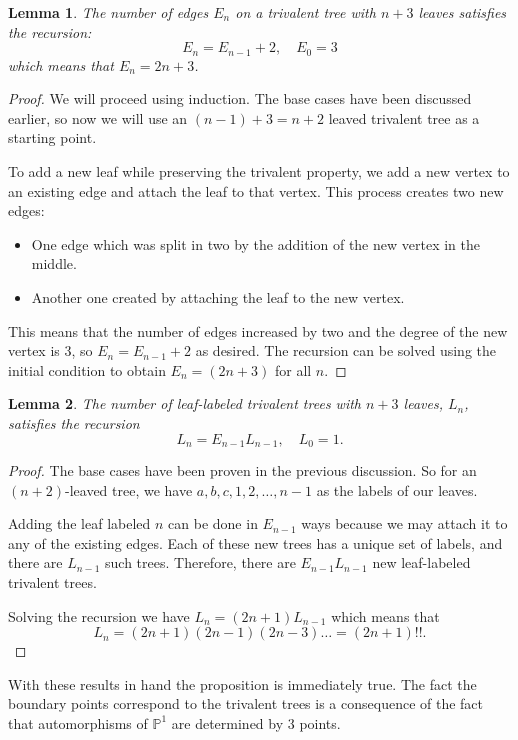 \documentclass[11pt]{article}
\newcommand{\bP}{\mathbb{P}}
\newtheorem{Lem}{Lemma}                 %
\theoremstyle{definition}
\theoremstyle{remark}
\numberwithin{theorem}{section}
\begin{document}
\begin{Lem}
The number of edges $E_n$ on a trivalent tree with $n+3$ leaves satisfies the recursion:
$$E_n=E_{n-1}+2,\quad E_0=3$$
which means that $E_n=2n+3$.
\end{Lem}

\begin{proof}
    We will proceed using induction. The base cases have been discussed earlier, so now we will use an $(n-1)+3=n+2$ leaved trivalent tree as a starting point.\par 
To add a new leaf while preserving the trivalent property, we add a new vertex to an existing edge and attach the leaf to that vertex. This process creates two new edges: 
\begin{itemize}
    \item One edge which was split in two by the addition of the new vertex in the middle.
    \item Another one created by attaching the leaf to the new vertex.
\end{itemize}
  This means that the number of edges increased by two and the degree of the new vertex is $3$, so $E_n=E_{n-1}+2$ as desired. The recursion can be solved using the initial condition to obtain $E_n=(2n+3)$ for all $n$.
\end{proof}

\begin{Lem}
The number of leaf-labeled trivalent trees with $n+3$ leaves, $L_n$, satisfies the recursion 
$$L_{n}=E_{n-1}L_{n-1},\quad L_0=1.$$ 
\end{Lem}

\begin{proof}
    The base cases have been proven in the previous discussion. So for an $(n+2)$-leaved tree, we have ${a,b,c,1,2,\dots,n-1}$ as the labels of our leaves.\par 
    Adding the leaf labeled $n$ can be done in $E_{n-1}$ ways because we may attach it to any of the existing edges. Each of these new trees has a unique set of labels, and there are $L_{n-1}$ such trees. Therefore, there are $E_{n-1}L_{n-1}$ new leaf-labeled trivalent trees.\par 
    Solving the recursion we have $L_n=(2n+1)L_{n-1}$ which means that 
    $$L_n=(2n+1)(2n-1)(2n-3)\dots=(2n+1)!!.$$
\end{proof}

With these results in hand the proposition is immediately true. The fact the boundary points correspond to the trivalent trees is a consequence of the fact that automorphisms of $\bP^1$ are determined by $3$ points.
\end{document}
